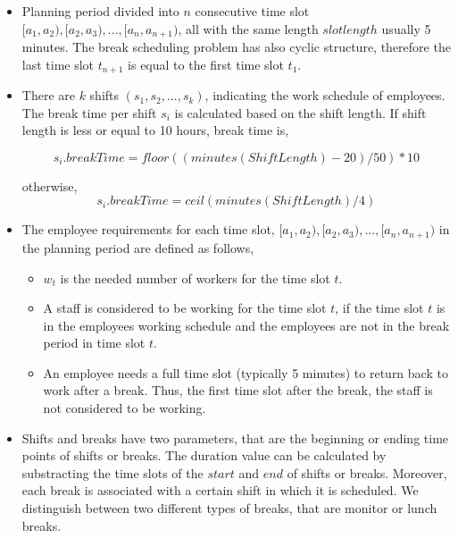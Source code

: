 \begin{itemize}

\item Planning period divided into $n$ consecutive time slot $[a_1,a_2), [a_2,a_3), . . . , [a_n,a_{n+1})$, all with the same length $slotlength$ usually 5 minutes. The break scheduling problem has also cyclic structure, therefore the last time slot $t_{n+1}$ is equal to the first time slot $t_1$.

\item There are $k$ shifts $(s_1, s_2, ..., s_k)$, indicating the work schedule of employees. The break time per shift $s_i$ is calculated based on the shift length. If shift length is less or equal to 10 hours, break time is,

\begin{equation}
s_i.breakTime = floor( ( minutes(Shift Length) - 20) / 50 ) * 10
\end{equation}

otherwise,
\begin{equation}
s_i.breakTime = ceil (   minutes(Shift Length) / 4 )
\end{equation}

\item The employee requirements for each time slot, $[a_1,a_2), [a_2,a_3), . . . , [a_n,a_{n+1})$ in the planning period are defined as follows,

\begin{itemize}
\item $w_t$ is the needed number of workers  for the time slot $t$.
\item A staff is considered to be working for the time slot $t$, if the time slot $t$ is in the employees working schedule and the employees are not in the break period in time slot $t$.
\item An employee needs a full time slot (typically 5 minutes) to return back to work after a break. Thus, the first time slot after the break, the staff is not considered to be working.
\end{itemize}

\item Shifts and breaks have two parameters, that are the beginning or ending time points of shifts or breaks. The duration value can be calculated by substracting the time slots of the $start$ and $end$ of shifts or breaks. Moreover, each break is associated with a certain shift in which it is scheduled. We distinguish between two different types of breaks, that are monitor or lunch breaks.

\end{itemize}

